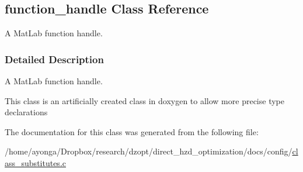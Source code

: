 \hypertarget{classfunction__handle}{}\subsection{function\+\_\+handle Class Reference}
\label{classfunction__handle}


A Mat\+Lab function handle.  




\subsubsection{Detailed Description}
A Mat\+Lab function handle. 

This class is an artificially created class in doxygen to allow more precise type declarations 

The documentation for this class was generated from the following file\+:\begin{DoxyCompactItemize}
\item 
/home/ayonga/\+Dropbox/research/dzopt/direct\+\_\+hzd\+\_\+optimization/docs/config/\hyperlink{class__substitutes_8c}{class\+\_\+substitutes.\+c}\end{DoxyCompactItemize}

